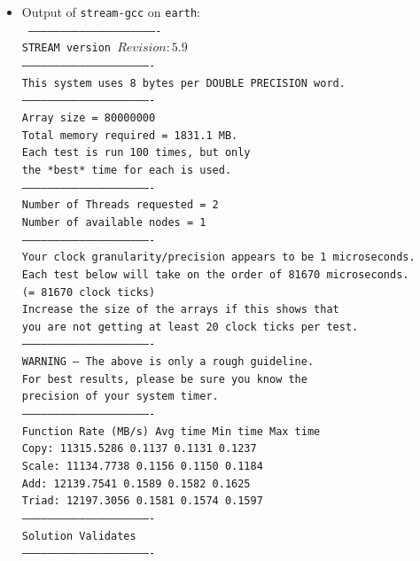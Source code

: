 \documentclass[]{article}
\begin{document}
\begin{itemize}
    \item Output of \texttt{stream-gcc} on \texttt{earth}: \\
    \texttt{\tiny 
------------------------------------------------------------- \\
STREAM version $Revision: 5.9 $ \\
------------------------------------------------------------- \\
This system uses 8 bytes per DOUBLE PRECISION word. \\
------------------------------------------------------------- \\
Array size = 80000000 \\
Total memory required = 1831.1 MB. \\
Each test is run 100 times, but only \\
the *best* time for each is used. \\
------------------------------------------------------------- \\
Number of Threads requested = 2 \\
Number of available nodes = 1 \\
------------------------------------------------------------- \\
Your clock granularity/precision appears to be 1 microseconds. \\
Each test below will take on the order of 81670 microseconds. \\
   (= 81670 clock ticks) \\
Increase the size of the arrays if this shows that \\
you are not getting at least 20 clock ticks per test. \\
------------------------------------------------------------- \\
WARNING -- The above is only a rough guideline. \\
For best results, please be sure you know the \\
precision of your system timer. \\
------------------------------------------------------------- \\
Function      Rate (MB/s)   Avg time     Min time     Max time \\
Copy:       11315.5286       0.1137       0.1131       0.1237 \\
Scale:      11134.7738       0.1156       0.1150       0.1184 \\
Add:        12139.7541       0.1589       0.1582       0.1625 \\
Triad:      12197.3056       0.1581       0.1574       0.1597 \\
------------------------------------------------------------- \\
Solution Validates \\
-------------------------------------------------------------
    }
    

\end{itemize}
\end{document}

